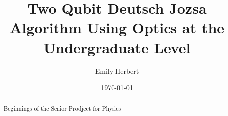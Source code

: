 \documentclass{amsart}
\author{Emily Herbert}
\date{\today}
\title{Two Qubit Deutsch Jozsa Algorithm Using Optics
at the Undergraduate Level}
\theoremstyle{definition}
\numberwithin{equation}{subsection}
\begin{document}
\maketitle
\begin{abstract}
   Beginnings of the Senior Prodject for Physics
\end{abstract}




\end{document}
